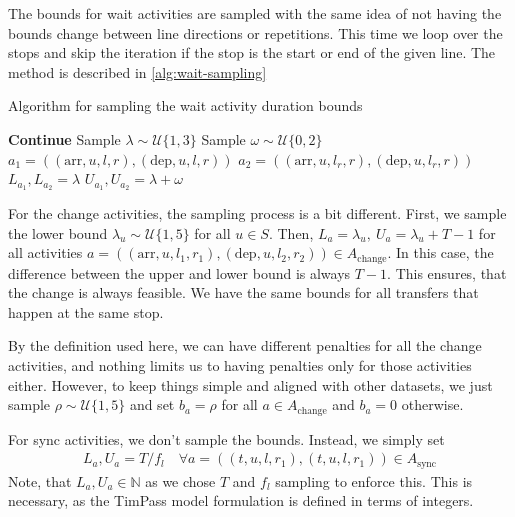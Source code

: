 \documentclass[english, 12pt, a4paper, sci, utf8, a-2b, online]{aaltothesis}
\newcommand{\N}{\mathbb{N}}
\newcommand{\Async}{A_\text{sync}}
\newcommand{\unif}[1]{\mathcal{U}\{#1\}}
\begin{document}
The bounds for wait activities are sampled with the same idea of not having the bounds change between line directions or repetitions. This time we loop over the stops and skip the iteration if the stop is the start or end of the given line. The method is described in \cref{alg:wait-sampling}

\begin{algorithm}[t]

    \caption{Algorithm for sampling the wait activity duration bounds}
    \label{alg:wait-sampling}
    \begin{algorithmic}
                    \State \textbf{Continue}
                \EndIf
                \State Sample $\lambda \sim \unif{1, 3}$ 
                \State Sample $\omega \sim \unif{0, 2}$ 
                    \State $a_1 = ((\text{arr}, u, l, r), (\text{dep}, u, l, r))$ 
                    \State $a_2 = ((\text{arr}, u, l_r, r), (\text{dep}, u, l_r, r))$ 
                    \State $L_{a_1}, L_{a_2} = \lambda$
                    \State $U_{a_1}, U_{a_2} = \lambda + \omega$
                \EndFor
            \EndFor
        \EndFor
    \end{algorithmic}
    
\end{algorithm}

For the change activities, the sampling process is a bit different. First, we sample the lower bound $\lambda_u \sim \unif{1, 5}$ for all $ u \in S$. Then, $L_a = \lambda_u,\ U_a = \lambda_u + T - 1$ for all activities $a = ((\text{arr}, u, l_1, r_1), (\text{dep}, u, l_2, r_2)) \in A_\text{change}$. In this case, the difference between the upper and lower bound is always $T-1$. This ensures, that the change is always feasible. We have the same bounds for all transfers that happen at the same stop.

By the definition used here, we can have different penalties for all the change activities, and nothing limits us to having penalties only for those activities either. However, to keep things simple and aligned with other datasets, we just sample $\rho \sim \unif{1, 5}$ and set $b_a = \rho$ for all $a \in A_\text{change}$ and $b_a = 0$ otherwise.

For sync activities, we don't sample the bounds. Instead, we simply set
\begin{align}
    L_a, U_a = T / f_l\quad  \forall a = ((t, u, l, r_1), (t, u, l, r_1)) \in \Async
\end{align}
Note, that $L_a, U_a \in \N$ as we chose $T$ and $f_l$ sampling to enforce this. This is necessary, as the TimPass model formulation is defined in terms of integers.
\end{document}
